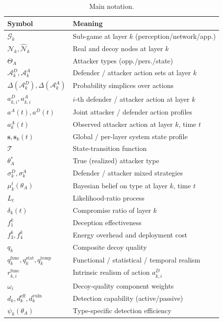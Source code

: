 \documentclass[conference]{IEEEtran}
\begin{document}
\begin{table}[t]
\centering
\caption{Main notation.}
\label{tab:notation}
\small
\begin{tabular}{ll}
\toprule
\textbf{Symbol} & \textbf{Meaning} \\
\midrule
$\mathcal{G}_k$ & Sub-game at layer $k$ (perception/network/app.) \\
$\mathcal{N}_k,\hat{\mathcal{N}}_k$ & Real and decoy nodes at layer $k$ \\
$\Theta_A$ & Attacker types (opp./pers./state) \\
$\mathcal{A}_k^D,\mathcal{A}_k^A$ & Defender / attacker action sets at layer $k$ \\
$\Delta(\mathcal{A}_k^D),\Delta(\mathcal{A}_k^A)$ & Probability simplices over actions \\
$a_{k,i}^D,a_{k,i}^A$ & $i$-th defender / attacker action at layer $k$ \\
$a^A(t),a^D(t)$ & Joint attacker / defender action profiles \\
$a_k^A(t)$ & Observed attacker action at layer $k$, time $t$ \\
$\mathbf{s},\mathbf{s}_k(t)$ & Global / per-layer system state profile \\
$\mathcal{T}$ & State-transition function \\
$\theta_A^*$ & True (realized) attacker type \\
$\sigma_k^D,\sigma_k^A$ & Defender / attacker mixed strategies \\
$\mu_k^t(\theta_A)$ & Bayesian belief on type at layer $k$, time $t$ \\ 
$L_t$ & Likelihood-ratio process\\
$\delta_k(t)$ & Compromise ratio of layer $k$ \\
$f_1^k$ & Deception effectiveness \\
$f_3^k,f_4^k$ & Energy overhead and deployment cost \\
$q_k$ & Composite decoy quality \\
$q_k^{\mathrm{func}},q_k^{\mathrm{stat}},q_k^{\mathrm{temp}}$ & Functional / statistical / temporal realism \\
$r_{k,i}^{\mathrm{func}}$ & Intrinsic realism of action $a_{k,i}^D$ \\
$\omega_i$ & Decoy-quality component weights \\
$d_k,d_k^{\mathrm{eff}},d_k^{\mathrm{vuln}}$ & Detection capability (active/passive) \\
$\psi_k(\theta_A)$ & Type-specific detection efficiency \\

\end{tabular}
\end{table}
\end{document}
